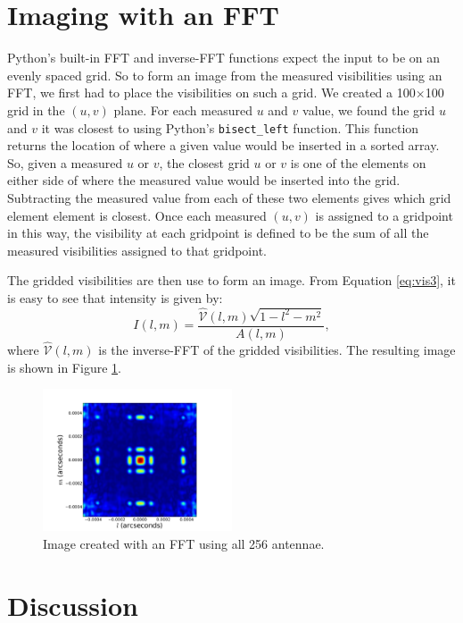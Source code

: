 \documentclass[11pt,letterpaper]{article}
\begin{document}
\section{Imaging with an FFT}
Python's built-in FFT and inverse-FFT functions expect the input 
to be on an evenly spaced grid.  So to form an image from the 
measured visibilities using an FFT, we first had to place the 
visibilities on such a grid.  We created a 100$\times$100 grid in 
the $(u,v)$ plane.  For each measured $u$ and $v$ value, we found the 
grid $u$ and $v$ it was closest to using Python's \texttt{bisect\_left} 
function.  This function returns the location of where a given value 
would be inserted in a sorted array.  So, given a measured $u$ or $v$, 
the closest grid $u$ or $v$ is one of the elements on either side of 
where the measured value would be inserted into the grid.  Subtracting the 
measured value from each of these two elements gives which grid element 
element is closest.  Once each measured $(u,v)$ is assigned to a 
gridpoint in this way, the visibility at each gridpoint is defined 
to be the sum of all the measured visibilities assigned to that gridpoint.

The gridded visibilities are then use to form an image.  From Equation 
\ref{eq:vis3}, it is easy to see that intensity is given by:
\begin{equation}
I(l,m)=\frac{\hat{\mathcal{V}}(l,m)\sqrt{1-l^2-m^2}}{A(l,m)},
\end{equation}
where $\hat{\mathcal{V}}(l,m)$ is the inverse-FFT of the gridded 
visibilities.  The resulting image is shown in Figure \ref{fig:fft}.

\begin{figure}[!h]
\centering
\includegraphics[width=0.5\textwidth]{FFT_Image.pdf}
\caption{Image created with an FFT using all 256 antennae.}
\label{fig:fft}
\end{figure}


\section{Discussion}
\end{document}
